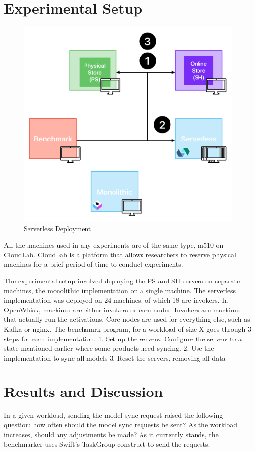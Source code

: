 \section{Experimental Setup}
\begin{figure}[h!]
    \centering
    \includegraphics[width=\textwidth]{media/bench_black.pdf}
    \caption{Serverless Deployment}
    \label{fig:sync3_5}
\end{figure}
All the machines used in any experiments are of the same type, m510 on CloudLab. CloudLab is a platform that allows researchers to reserve physical machines for a brief period of time to conduct experiments.

The experimental setup involved deploying the PS and SH servers on separate machines, the monolithic implementation on a single machine. The serverless implementation was deployed on 24 machines, of which 18 are invokers.
In OpenWhisk, machines are either invokers or core nodes. Invokers are machines that actually run the activations. Core nodes are used for everything else, such as Kafka or nginx.
The benchamrk program, for a workload of size X goes through 3 steps for each implementation:
1. Set up the servers: Configure the servers to a state mentioned earlier where some products need syncing.
2. Use the implementation to sync all models
3. Reset the servers, removing all data


\section{Results and Discussion}
In a given workload, sending the model sync request raised the following question: how often should the model sync requests be sent? As the workload increases, should any adjustments be made? As it currently stands, the benchmarker uses Swift's TaskGroup construct to send the requests.
